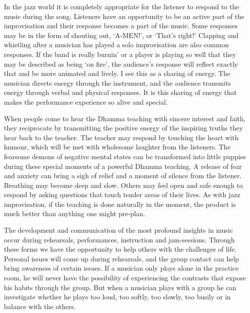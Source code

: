 In the jazz world it is completely appropriate for the listener to
respond to the music during the song. Listeners have an opportunity to
be an active part of the improvisation and their response becomes a part
of the music. Some responses may be in the form of shouting out, 
`A-MEN!', or `That's right!' Clapping and whistling after a
musician has played a solo improvisation are also common responses. If
the band is really burnin' or a player is playing so well that they
may be described as being `on fire', the audience's response will
reflect exactly that and be more animated and lively. I see this as a
sharing of energy. The musician directs energy through the instrument, 
and the audience transmits energy through verbal and physical responses. 
It is this sharing of energy that makes the performance experience so
alive and special. 

When people come to hear the Dhamma teaching with sincere interest and
faith, they reciprocate by transmitting the positive energy of the
inspiring truths they hear back to the teacher. The teacher may respond
by touching the heart with humour, which will be met with wholesome
laughter from the listeners. The fearsome demons of negative mental
states can be transformed into little puppies during these special
moments of a powerful Dhamma teaching. A release of fear and anxiety can
bring a sigh of relief and a moment of silence from the listener. 
Breathing may become deep and slow. Others may feel open and safe enough
to respond by asking questions that touch tender areas of their lives. 
As with jazz improvisation, if the teaching is done naturally in the
moment, the product is much better than anything one might pre-plan. 

The development and communication of the most profound insights in music
occur during rehearsals, performances, instruction and jam-sessions. 
Through these forms we have the opportunity to help others with the
challenges of life. Personal issues will come up during rehearsals, and
the group contact can help bring awareness of certain issues. If a
musician only plays alone in the practice room, he will never have the
possibility of experiencing the contrasts that expose his habits through
the group. But when a musician plays with a group he can investigate
whether he plays too loud, too softly, too slowly, too busily or in balance
with the others. 


